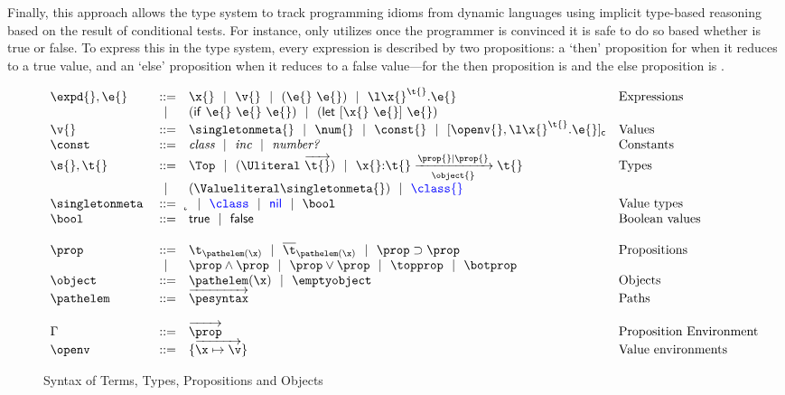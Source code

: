 Finally, this approach allows the type system to track
programming idioms from 
dynamic languages
using implicit type-based reasoning based on the result of
conditional tests.
For instance, 
only utilizes  once
the programmer is convinced it is safe to do so based whether
is 
true or false. 
To express this in the type system, every expression 
is described by two propositions: a `then' proposition
for when it reduces to a true value, and an `else' proposition
when it reduces to a false value---for 
the then proposition is {\isprop{\NumberFull}{\x{}}} and 
the else proposition is {\notprop{\NumberFull}{\x{}}}.

\begin{figure}
  \footnotesize
$$
\begin{array}{lrll}
  \expd{}, \e{} &::=& \x{}
                      \alt \v{} 
                      \alt {\comb {\e{}} {\e{}}} 
                      \alt {\abs {\x{}} {\t{}} {\e{}}} &\mbox{Expressions} \\
                      &\alt& {\ifexp {\e{}} {\e{}} {\e{}}}
                      \alt {\letexp {\x{}} {\e{}} {\e{}}}\\
  \v{} &::=&          \singletonmeta{}
                      \alt {\num{}}
                      \alt {\const{}}
                      \alt {\closure {\openv{}} {\abs {\x{}} {\t{}} {\e{}}}}
                &\mbox{Values} \\
                \constantssyntax{}\\
  \s{}, \t{}    &::=& \Top 
                      \alt {\Unionsplice {\overrightarrow{\t{}}}}
                      \alt
                      {\ArrowOne {\x{}} {\t{}}
                                   {\t{}}
                                   {\filterset {\prop{}} {\prop{}}}
                                   {\object{}}}
                &\mbox{Types} \\
                      &\alt& {\Value \singletonmeta{}} 
                      \alt \trdiff{\class{}}\\
  \singletonallsyntax{}
                \\ \\
  \occurrencetypingsyntax{}\\
  \propenvsyntax{}\\
  \openvsyntax{}
\end{array}
$$
\caption{Syntax of Terms, Types, Propositions and Objects}
\label{main:figure:termsyntax}
\end{figure}


